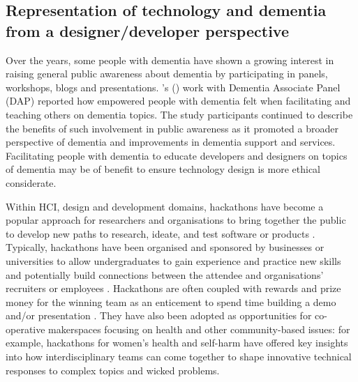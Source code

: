 \subsection{Representation of technology and dementia from a designer/developer perspective}
\label{BL:gap:engagement}
Over the years, some people with dementia have shown a growing interest in raising general public awareness about dementia by participating in panels, workshops, blogs and presentations. \citeauthor{innes2021s}'s (\citeyear{innes2021s}) work with Dementia Associate Panel (DAP) reported how empowered people with dementia felt when facilitating and teaching others on dementia topics. The study participants continued to describe the benefits of such involvement in public awareness as it promoted a broader perspective of dementia and improvements in dementia support and services. Facilitating people with dementia to educate developers and designers on topics of dementia may be of benefit to ensure technology design is more ethical considerate. 

Within HCI, design and development domains, hackathons have become a popular approach for researchers and organisations to bring together the public to develop new paths to research, ideate, and test software or products \citep{medina_angarita_what_2020}. Typically, hackathons have been organised and sponsored by businesses or universities to allow undergraduates to gain experience and practice new skills and potentially build connections between the attendee and organisations' recruiters or employees \citep{hope_hackathons_2019}. Hackathons are often coupled with rewards and prize money for the winning team as an enticement to spend time building a demo and/or presentation \citep{johnson_civic_2014}. They have also been adopted as opportunities for co-operative makerspaces focusing on health and other community-based issues: for example, hackathons for women’s health \citep{paganini_engaging_2020} and self-harm \citep{birbeck_self_2017} have offered key insights into how interdisciplinary teams can come together to shape innovative technical responses to complex topics and wicked problems. 

